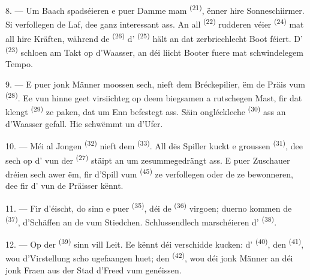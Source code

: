 8. --- Um Baach spadséieren e puer Damme mam  \textsuperscript{(21)},
ënner hire Sonneschiirmer. Si verfollegen de Laf, dee ganz interessant ass. An all
 \textsuperscript{(22)} rudderen véier 
\textsuperscript{(24)} mat all hire Kräften, während de 
\textsuperscript{(26)} d' \textsuperscript{(25)} hält an dat
zerbriechlecht Boot féiert. D' \textsuperscript{(23)} schloen am
Takt op d'Waasser, an déi liicht Booter fuere mat schwindelegem Tempo.

9. --- E puer jonk Männer moossen sech, nieft dem Bréckepilier, ëm de Präis vum
 \textsuperscript{(28)}. Ee vun hinne geet virsiichteg op deem
biegsamen a rutschegen Mast, fir dat klengt 
\textsuperscript{(29)} ze paken, dat um Enn befestegt ass. Säin ongléckleche
 \textsuperscript{(30)} ass an d'Waasser gefall. Hie schwëmmt un
d'Ufer.

10. --- Méi al Jongen  \textsuperscript{(32)} nieft
dem  \textsuperscript{(33)}. All dës Spiller kuckt e groussen
 \textsuperscript{(31)}, dee sech op d' vun der
 \textsuperscript{(27)} stäipt an um  zesummegedrängt ass.
E puer Zuschauer dréien sech awer ëm, fir d'Spill vum 
\textsuperscript{(45)} ze verfollegen oder de 
ze bewonneren, dee fir d' vun de Präisser kënnt.

11. --- Fir d'éischt, do sinn e puer  \textsuperscript{(35)}, déi de
 \textsuperscript{(36)} virgoen; duerno kommen de
 \textsuperscript{(37)}, d'Schäffen an de
 vum Stiedchen. Schlussendlech marschéieren d'
\textsuperscript{(38)}.

\VUsaut{5.0mm}
\VUsaut{3.6mm}

12. --- Op der  \textsuperscript{(39)} sinn vill Leit. Ee kënnt déi
verschidde  kucken: d' \textsuperscript{(40)}, den
 \textsuperscript{(41)}, wou d'Virstellung scho ugefaangen huet; den
 \textsuperscript{(42)}, wou déi jonk Männer an déi jonk
Fraen aus der Stad d'Freed vum  genéissen.

